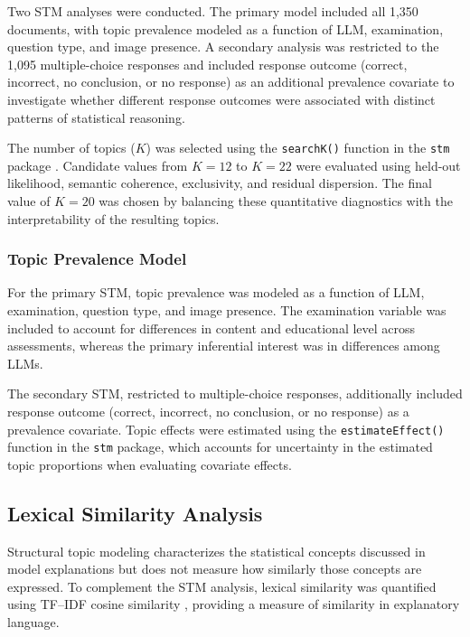 \documentclass[APA,LATO2COL]{WileyNJDv5}
\newcommand{\pkg}[1]{\texttt{#1}}
\newcommand{\code}[1]{\texttt{#1}}
\begin{document}
Two STM analyses were conducted. The primary model included all 1,350
documents, with topic prevalence modeled as a function of LLM,
examination, question type, and image presence. A secondary analysis was
restricted to the 1,095 multiple-choice responses and included response
outcome (correct, incorrect, no conclusion, or no response) as an
additional prevalence covariate to investigate whether different response
outcomes were associated with distinct patterns of statistical reasoning.

The number of topics ($K$) was selected using the
\code{searchK()} function in the \pkg{stm} package
\cite{roberts2019}. Candidate values from $K=12$ to $K=22$
were evaluated using held-out likelihood, semantic coherence,
exclusivity, and residual dispersion. The final value of $K = 20$
was chosen by balancing these quantitative diagnostics with the
interpretability of the resulting topics.

\subsubsection{Topic Prevalence Model}

For the primary STM, topic prevalence was modeled as a function of LLM,
examination, question type, and image presence. The examination variable
was included to account for differences in content and educational level
across assessments, whereas the primary inferential interest was in
differences among LLMs.

The secondary STM, restricted to multiple-choice responses, additionally
included response outcome (correct, incorrect, no conclusion, or no
response) as a prevalence covariate. Topic effects were estimated using the
\code{estimateEffect()} function in the \pkg{stm} package, which accounts
for uncertainty in the estimated topic proportions when evaluating
covariate effects.


\subsection{Lexical Similarity Analysis}

Structural topic modeling characterizes the statistical concepts discussed in model explanations but does not measure how similarly those concepts are expressed. To complement the STM analysis, lexical similarity was quantified using TF–IDF cosine similarity \cite{SALTON1988513, manning2008introduction}, providing a measure of similarity in explanatory language.
\end{document}
